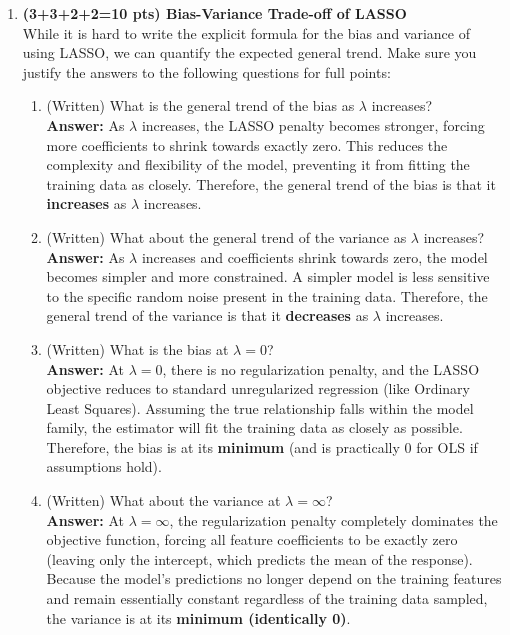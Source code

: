 \documentclass[a4paper,12pt]{article}
\begin{document}
\begin{enumerate}
    \item \textbf{(3+3+2+2=10 pts) Bias-Variance Trade-off of LASSO} \\
    While it is hard to write the explicit formula for the bias and variance of using LASSO, we can quantify the expected general trend. Make sure you justify the answers to the following questions for full points:
    \begin{enumerate}
        \item[(a)] (Written) What is the general trend of the bias as $\lambda$ increases? \\
        \textbf{Answer:} As $\lambda$ increases, the LASSO penalty becomes stronger, forcing more coefficients to shrink towards exactly zero. This reduces the complexity and flexibility of the model, preventing it from fitting the training data as closely. Therefore, the general trend of the bias is that it \textbf{increases} as $\lambda$ increases.
        \item[(b)] (Written) What about the general trend of the variance as $\lambda$ increases? \\
        \textbf{Answer:} As $\lambda$ increases and coefficients shrink towards zero, the model becomes simpler and more constrained. A simpler model is less sensitive to the specific random noise present in the training data. Therefore, the general trend of the variance is that it \textbf{decreases} as $\lambda$ increases.
        \item[(c)] (Written) What is the bias at $\lambda = 0$? \\
        \textbf{Answer:} At $\lambda = 0$, there is no regularization penalty, and the LASSO objective reduces to standard unregularized regression (like Ordinary Least Squares). Assuming the true relationship falls within the model family, the estimator will fit the training data as closely as possible. Therefore, the bias is at its \textbf{minimum} (and is practically 0 for OLS if assumptions hold).
        \item[(d)] (Written) What about the variance at $\lambda = \infty$? \\
        \textbf{Answer:} At $\lambda = \infty$, the regularization penalty completely dominates the objective function, forcing all feature coefficients to be exactly zero (leaving only the intercept, which predicts the mean of the response). Because the model's predictions no longer depend on the training features and remain essentially constant regardless of the training data sampled, the variance is at its \textbf{minimum (identically 0)}.
    \end{enumerate}


\end{enumerate}
\end{document}
